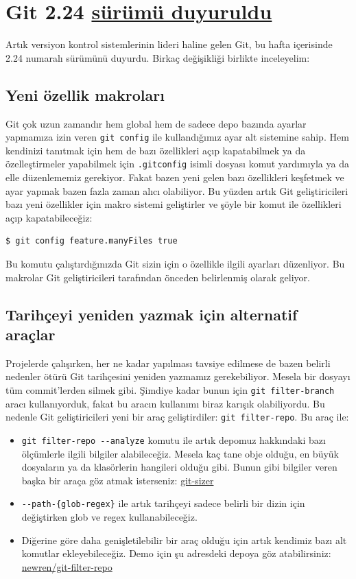 \documentclass[11pt]{article}
\begin{document}
\section{Git 2.24 \href{https://raw.githubusercontent.com/git/git/master/Documentation/RelNotes/2.24.0.txt}{sürümü duyuruldu}}
\label{sec:orga85495d}
Artık versiyon kontrol sistemlerinin lideri haline gelen Git, bu hafta
içerisinde 2.24 numaralı sürümünü duyurdu. Birkaç değişikliği birlikte
inceleyelim:

\subsection{Yeni özellik makroları}
\label{sec:orge2b0012}
Git çok uzun zamandır hem global hem de sadece depo bazında ayarlar yapmamıza
izin veren \texttt{git config} ile kullandığımız ayar alt sistemine sahip. Hem
kendinizi tanıtmak için hem de bazı özellikleri açıp kapatabilmek ya da
özelleştirmeler yapabilmek için \texttt{.gitconfig} isimli dosyası komut yardımıyla
ya da elle düzenlememiz gerekiyor. Fakat bazen yeni gelen bazı özellikleri
keşfetmek ve ayar yapmak bazen fazla zaman alıcı olabiliyor. Bu yüzden artık
Git geliştiricileri bazı yeni özellikler için makro sistemi geliştirler ve
şöyle bir komut ile özellikleri açıp kapatabileceğiz:
\begin{verbatim}
$ git config feature.manyFiles true
\end{verbatim}
Bu komutu çalıştırdığınızda Git sizin için o özellikle ilgili ayarları
düzenliyor. Bu makrolar Git geliştiricileri tarafından önceden belirlenmiş
olarak geliyor.
\subsection{Tarihçeyi yeniden yazmak için alternatif araçlar}
\label{sec:org96143ca}
Projelerde çalışırken, her ne kadar yapılması tavsiye edilmese de bazen
belirli nedenler ötürü Git tarihçesini yeniden yazmamız gerekebiliyor. Mesela
bir dosyayı tüm commit'lerden silmek gibi. Şimdiye kadar bunun için \texttt{git
	 filter-branch} aracı kullanıyorduk, fakat bu aracın kullanımı biraz karışık
olabiliyordu. Bu nedenle Git geliştiricileri yeni bir araç geliştirdiler: \texttt{git
	 filter-repo}. Bu araç ile:
\begin{itemize}
\item \texttt{git filter-repo -{}-analyze} komutu ile artık depomuz hakkındaki bazı
ölçümlerle ilgili bilgiler alabileceğiz. Mesela kaç tane obje olduğu, en
büyük dosyaların ya da klasörlerin hangileri olduğu gibi. Bunun gibi
bilgiler veren başka bir araça göz atmak isterseniz: \href{https://github.com/github/git-sizer}{git-sizer}
\item \texttt{-{}-path-\{glob-regex\}} ile artık tarihçeyi sadece belirli bir dizin için
değiştirken glob ve regex kullanabileceğiz.
\item Diğerine göre daha genişletilebilir bir araç olduğu için artık kendimiz
bazı alt komutlar ekleyebileceğiz. Demo için şu adresdeki depoya göz
atabilirsiniz: \href{https://github.com/newren/git-filter-repo/tree/master/contrib/filter-repo-demos}{newren/git-filter-repo}
\end{itemize}
\end{document}

